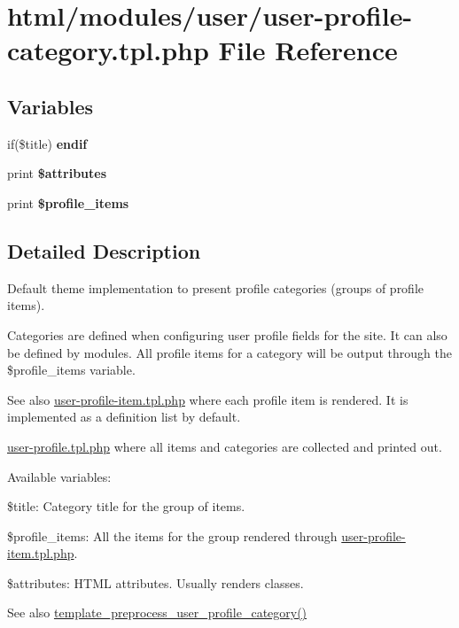 \hypertarget{user-profile-category_8tpl_8php}{
\section{html/modules/user/user-\/profile-\/category.tpl.php File Reference}
\label{user-profile-category_8tpl_8php}
}
\subsection*{Variables}
\begin{DoxyCompactItemize}
\item 
\hypertarget{user-profile-category_8tpl_8php_aa9240680e3cbd38bd81f4a04400b4b1a}{
if(\$title) {\bfseries endif}}
\label{user-profile-category_8tpl_8php_aa9240680e3cbd38bd81f4a04400b4b1a}

\item 
\hypertarget{user-profile-category_8tpl_8php_a9c88c4272fa40546577b45392a0b3cd3}{
print {\bfseries \$attributes}}
\label{user-profile-category_8tpl_8php_a9c88c4272fa40546577b45392a0b3cd3}

\item 
\hypertarget{user-profile-category_8tpl_8php_a4e552bb6a277c7ba559bc5d42be75b41}{
print {\bfseries \$profile\_\-items}}
\label{user-profile-category_8tpl_8php_a4e552bb6a277c7ba559bc5d42be75b41}

\end{DoxyCompactItemize}


\subsection{Detailed Description}
Default theme implementation to present profile categories (groups of profile items).

Categories are defined when configuring user profile fields for the site. It can also be defined by modules. All profile items for a category will be output through the \$profile\_\-items variable.

\begin{DoxySeeAlso}{See also}
\hyperlink{user-profile-item_8tpl_8php}{user-\/profile-\/item.tpl.php} where each profile item is rendered. It is implemented as a definition list by default. 

\hyperlink{user-profile_8tpl_8php}{user-\/profile.tpl.php} where all items and categories are collected and printed out.
\end{DoxySeeAlso}
Available variables:
\begin{DoxyItemize}
\item \$title: Category title for the group of items.
\item \$profile\_\-items: All the items for the group rendered through \hyperlink{user-profile-item_8tpl_8php}{user-\/profile-\/item.tpl.php}.
\item \$attributes: HTML attributes. Usually renders classes.
\end{DoxyItemize}

\begin{DoxySeeAlso}{See also}
\hyperlink{user_8pages_8inc_a0b8961894318ad623017b48569515d4a}{template\_\-preprocess\_\-user\_\-profile\_\-category()} 
\end{DoxySeeAlso}
